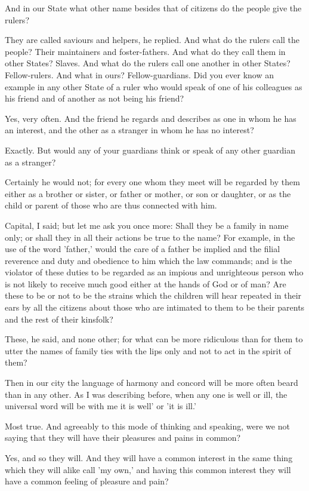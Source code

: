 And in our State what other name besides that of citizens do the people give the rulers?

They are called saviours and helpers, he replied.
And what do the rulers call the people?
Their maintainers and foster-fathers.
And what do they call them in other States?
Slaves.
And what do the rulers call one another in other States?
Fellow-rulers.
And what in ours?
Fellow-guardians.
Did you ever know an example in any other State of a ruler who would speak of one of his colleagues as his friend and of another as not being his friend?

Yes, very often.
And the friend he regards and describes as one in whom he has an interest, and the other as a stranger in whom he has no interest?

Exactly.
But would any of your guardians think or speak of any other guardian as a stranger?

Certainly he would not; for every one whom they meet will be regarded by them either as a brother or sister, or father or mother, or son or daughter, or as the child or parent of those who are thus connected with him.

Capital, I said; but let me ask you once more: Shall they be a family in name only; or shall they in all their actions be true to the name? For example, in the use of the word 'father,' would the care of a father be implied and the filial reverence and duty and obedience to him which the law commands; and is the violator of these duties to be regarded as an impious and unrighteous person who is not likely to receive much good either at the hands of God or of man? Are these to be or not to be the strains which the children will hear repeated in their ears by all the citizens about those who are intimated to them to be their parents and the rest of their kinsfolk?

These, he said, and none other; for what can be more ridiculous than for them to utter the names of family ties with the lips only and not to act in the spirit of them?

Then in our city the language of harmony and concord will be more often beard than in any other. As I was describing before, when any one is well or ill, the universal word will be with me it is well' or 'it is ill.'

Most true.
And agreeably to this mode of thinking and speaking, were we not saying that they will have their pleasures and pains in common?

Yes, and so they will.
And they will have a common interest in the same thing which they will alike call 'my own,' and having this common interest they will have a common feeling of pleasure and pain?

